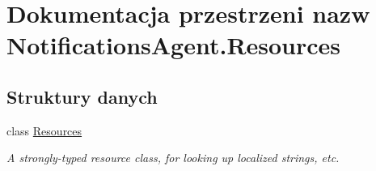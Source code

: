 \hypertarget{a00304}{}\section{Dokumentacja przestrzeni nazw Notifications\+Agent.\+Resources}
\label{a00304}
\subsection*{Struktury danych}
\begin{DoxyCompactItemize}
\item 
class \hyperlink{a00047}{Resources}
\begin{DoxyCompactList}\small\item\em A strongly-\/typed resource class, for looking up localized strings, etc. \end{DoxyCompactList}\end{DoxyCompactItemize}

